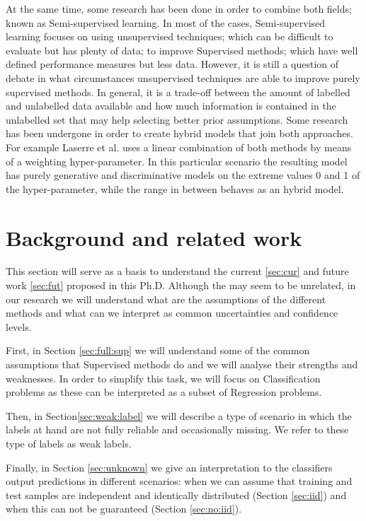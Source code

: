 \documentclass[a4paper, 12pt]{article}
\begin{document}
At the same time, some research has been done in order to combine both fields; known as Semi-supervised learning.
In most of the cases, Semi-supervised learning focuses on using unsupervised techniques; which can be difficult to evaluate but has plenty of data; to improve Supervised methods; which have well defined performance measures but less data.
However, it is still a question of debate in what circumstances unsupervised techniques are able to improve purely supervised methods.
In general, it is a trade-off between the amount of labelled and unlabelled data available and how much information is contained in the unlabelled set that may help selecting better prior assumptions.
Some research has been undergone in order to create hybrid models that join both approaches. For example Laserre et al. \cite{Lasserre2006, Bishop2007} uses a linear combination of both methods by means of a  weighting hyper-parameter.
In this particular scenario the resulting model has purely generative and discriminative models on the extreme values 0 and 1 of the hyper-parameter, while the range in between behaves as an hybrid model. 

\section{Background and related work}
\label{sec:back}

This section will serve as a basis to understand the current \ref{sec:cur}  and future work \ref{sec:fut} proposed in this Ph.D.
Although the may seem to be unrelated, in our research we will understand what are the assumptions of the different methods and what can we interpret as common uncertainties and confidence levels. 

First, in Section \ref{sec:full:sup} we will understand some of the common assumptions that Supervised methods do and we will analyse their strengths and weaknesses.
In order to simplify this task, we will focus on Classification problems as these can be interpreted as a subset of Regression problems.

Then, in Section\ref{sec:weak:label} we will describe a type of scenario in which the labels at hand are not fully reliable and occasionally missing. We refer to these type of labels as weak labels.

Finally, in Section \ref{sec:unknown} we give an interpretation to the classifiers output predictions in different scenarios: when we can assume that training and test samples are independent and identically distributed (Section \ref{sec:iid}) and when this can not be guaranteed (Section \ref{sec:no:iid}).
\end{document}
